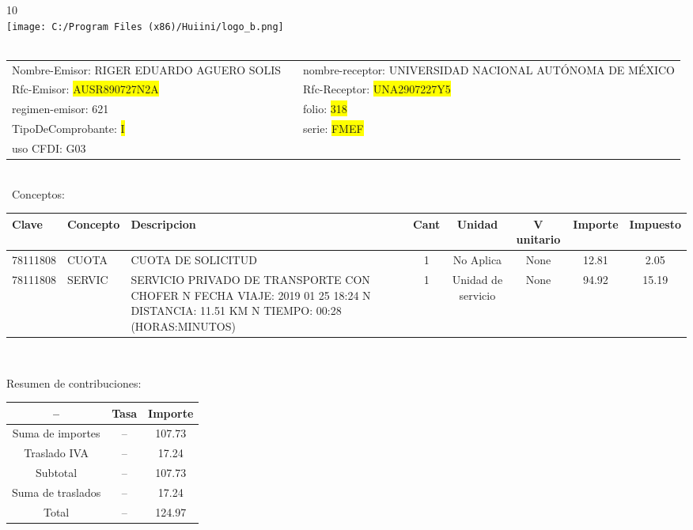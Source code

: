 \documentclass{article}
\begin{document}
\hspace{18cm} 10\\
\texttt{[image: C:/Program Files (x86)/Huiini/logo\_b.png]}
\bigskip\\\
\begin{tabular}{p{11cm}p{1cm}p{8cm}}

Nombre-Emisor: RIGER EDUARDO AGUERO SOLIS && nombre-receptor: UNIVERSIDAD NACIONAL AUTÓNOMA DE MÉXICO\\

Rfc-Emisor: \colorbox{yellow}{ AUSR890727N2A } & & Rfc-Receptor: \colorbox{yellow}{ UNA2907227Y5 }\\

regimen-emisor: 621 & & folio: \colorbox{yellow}{ 318 }\\

TipoDeComprobante: \colorbox{yellow}{ I } & & serie: \colorbox{yellow}{ FMEF }\\

uso CFDI: G03\\



\end{tabular}
\bigskip\bigskip\bigskip\\\
Conceptos:\\
\begin{tabular}{|p{1.5cm}|p{3.6cm}|p{3.6cm}|c|c|c|c|c|}
\hline
Clave & Concepto & Descripcion & Cant & Unidad & V unitario & Importe & Impuesto \\
\hline

78111808 & CUOTA  & CUOTA DE SOLICITUD & 1 & No Aplica & None & 12.81 &  2.05 \\
\hline

78111808 & SERVIC & SERVICIO PRIVADO DE TRANSPORTE CON CHOFER  N FECHA VIAJE: 2019 01 25 18:24  N DISTANCIA: 11.51 KM  N TIEMPO: 00:28 (HORAS:MINUTOS) & 1 & Unidad de servicio & None & 94.92 &  15.19 \\
\hline

\end{tabular}\\
\bigskip
\begin{center}
Resumen de contribuciones:\\
\bigskip
\begin{tabular}{|c|c|c|}
\hline
 -- & Tasa & Importe\\
\hline

Suma de importes & -- & 107.73 \\
\hline

Traslado IVA & -- & 17.24 \\
\hline

Subtotal  & -- & 107.73 \\
\hline

Suma de traslados & -- & 17.24 \\
\hline

Total  & -- & 124.97 \\
\hline

\end{tabular}
\end{center}
\end{document}

